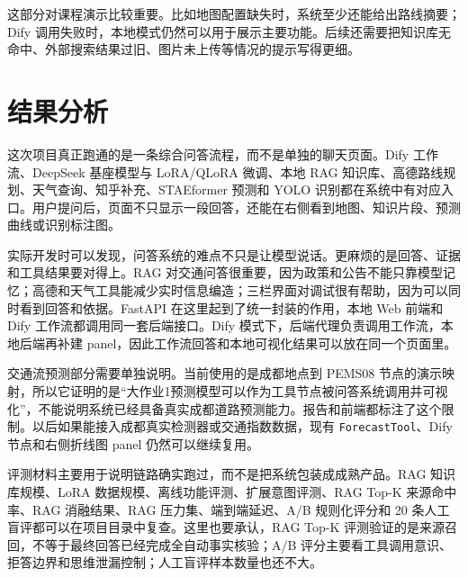 \documentclass[bwprint]{report}
\begin{document}
这部分对课程演示比较重要。比如地图配置缺失时，系统至少还能给出路线摘要；Dify 调用失败时，本地模式仍然可以用于展示主要功能。后续还需要把知识库无命中、外部搜索结果过旧、图片未上传等情况的提示写得更细。

\section{结果分析}
这次项目真正跑通的是一条综合问答流程，而不是单独的聊天页面。Dify 工作流、DeepSeek 基座模型与 LoRA/QLoRA 微调、本地 RAG 知识库、高德路线规划、天气查询、知乎补充、STAEformer 预测和 YOLO 识别都在系统中有对应入口。用户提问后，页面不只显示一段回答，还能在右侧看到地图、知识片段、预测曲线或识别标注图。

实际开发时可以发现，问答系统的难点不只是让模型说话。更麻烦的是回答、证据和工具结果要对得上。RAG 对交通问答很重要，因为政策和公告不能只靠模型记忆；高德和天气工具能减少实时信息编造；三栏界面对调试很有帮助，因为可以同时看到回答和依据。FastAPI 在这里起到了统一封装的作用，本地 Web 前端和 Dify 工作流都调用同一套后端接口。Dify 模式下，后端代理负责调用工作流，本地后端再补建 panel，因此工作流回答和本地可视化结果可以放在同一个页面里。

交通流预测部分需要单独说明。当前使用的是成都地点到 PEMS08 节点的演示映射，所以它证明的是``大作业1预测模型可以作为工具节点被问答系统调用并可视化''，不能说明系统已经具备真实成都道路预测能力。报告和前端都标注了这个限制。以后如果能接入成都真实检测器或交通指数数据，现有 \texttt{ForecastTool}、Dify 节点和右侧折线图 panel 仍然可以继续复用。

评测材料主要用于说明链路确实跑过，而不是把系统包装成成熟产品。RAG 知识库规模、LoRA 数据规模、离线功能评测、扩展意图评测、RAG Top-K 来源命中率、RAG 消融结果、RAG 压力集、端到端延迟、A/B 规则化评分和 20 条人工盲评都可以在项目目录中复查。这里也要承认，RAG Top-K 评测验证的是来源召回，不等于最终回答已经完成全自动事实核验；A/B 评分主要看工具调用意识、拒答边界和思维泄漏控制；人工盲评样本数量也还不大。
\end{document}
